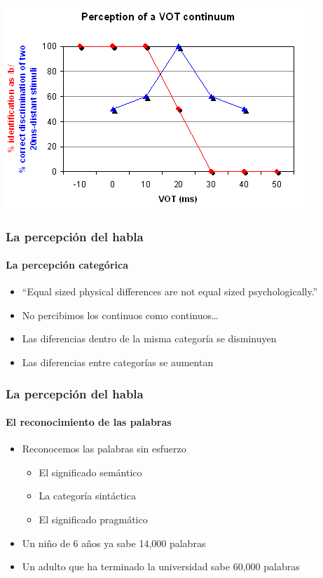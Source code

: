 \documentclass{beamer}
\begin{document}
\begin{frame}[plain]
	\begin{center}
		\includegraphics[width=\textwidth]{figures/pc3.png}
	\end{center}
\end{frame}

\begin{frame}
	\frametitle{La percepción del habla}
	\framesubtitle{La percepción categórica}

	\begin{itemize}
		\item ``Equal sized physical differences are not equal sized psychologically.''
		\item No percibimos los continuos como continuos\ldots
		\item Las diferencias dentro de la misma categoría se disminuyen 
		\item Las diferencias entre categorías se aumentan
	\end{itemize}
\end{frame}

\begin{frame} 
	\frametitle{La percepción del habla}
	\framesubtitle{El reconocimiento de las palabras}
	
	\begin{itemize}
		\item Reconocemos las palabras sin esfuerzo 
		\begin{itemize}
			\item El significado semántico
			\item La categoría sintáctica
			\item El significado pragmático
		\end{itemize}
		\item Un niño de 6 años ya sabe 14,000 palabras
		\item Un adulto que ha terminado la universidad sabe 60,000 palabras
	\end{itemize}
\end{frame}
\end{document}
